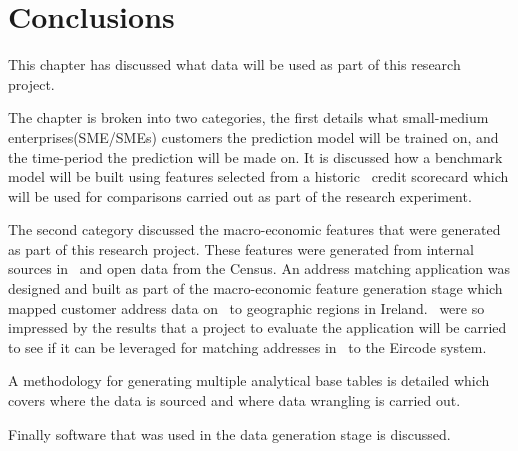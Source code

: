 \section{Conclusions}\label{desConc}
This chapter has discussed what data will be used as part of this research project. 

The chapter is broken into two categories, the first details what small-medium enterprises(SME/SMEs) customers the prediction model will be trained on, and the time-period the prediction will be made on. It is discussed how a benchmark model will be built using features selected from a historic \subjectname\ credit scorecard which will be used for comparisons carried out as part of the research experiment.

The second category discussed the macro-economic features that were generated as part of this research project. These features were generated from internal sources in \subjectname\ and open data from the Census. An address matching application was designed and built as part of the macro-economic feature generation stage which mapped customer address data on \subjectname\ to geographic regions in Ireland. \subjectname\ were so impressed by the results that a project to evaluate the application will be carried to see if it can be leveraged for matching addresses in \subjectname\ to the Eircode system.

A methodology for generating multiple analytical base tables is detailed which covers where the data is sourced and where data wrangling is carried out. 

Finally software that was used in the data generation stage is discussed.

